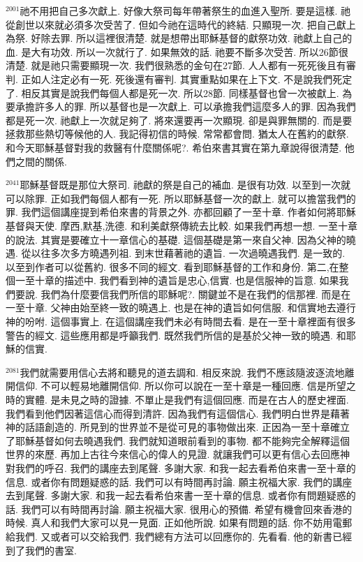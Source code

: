 \documentclass{book}
\begin{document}
$^{2001}$祂不用把自己多次獻上.
好像大祭司每年帶著祭生的血進入聖所.
要是這樣.
祂從創世以來就必須多次受苦了.
但如今祂在這時代的終結.
只顯現一次.
把自己獻上為祭.
好除去罪.
所以這裡很清楚.
就是想帶出耶穌基督的獻祭功效.
祂獻上自己的血.
是大有功效.
所以一次就行了.
如果無效的話.
祂要不斷多次受苦.
所以26節很清楚.
就是祂只需要顯現一次.
我們很熟悉的金句在27節.
人人都有一死死後且有審判.
正如人注定必有一死.
死後還有審判.
其實重點如果在上下文.
不是說我們死定了.
相反其實是說我們每個人都是死一次.
所以28節.
同樣基督也曾一次被獻上.
為要承擔許多人的罪.
所以基督也是一次獻上.
可以承擔我們這麼多人的罪.
因為我們都是死一次.
祂獻上一次就足夠了.
將來還要再一次顯現.
卻是與罪無關的.
而是要拯救那些熱切等候他的人.
我記得初信的時候.
常常都會問.
猶太人在舊約的獻祭.
和今天耶穌基督對我的救醫有什麼關係呢?.
希伯來書其實在第九章說得很清楚.
他們之間的關係.

$^{2041}$耶穌基督既是那位大祭司.
祂獻的祭是自己的補血.
是很有功效.
以至到一次就可以除罪.
正如我們每個人都有一死.
所以耶穌基督一次的獻上.
就可以擔當我們的罪.
我們這個講座提到希伯來書的背景之外.
亦都回顧了一至十章.
作者如何將耶穌基督與天使.
摩西,默基,洗德.
和利美獻祭傳統去比較.
如果我們再想一想.
一至十章的說法.
其實是要確立十一章信心的基礎.
這個基礎是第一來自父神.
因為父神的曉遇.
從以往多次多方曉遇列祖.
到末世藉著祂的遺旨.
一次過曉遇我們.
是一致的.
以至到作者可以從舊約.
很多不同的經文.
看到耶穌基督的工作和身份.
第二,在整個一至十章的描述中.
我們看到神的遺旨是忠心,信實.
也是信服神的旨意.
如果我們要說.
我們為什麼要信我們所信的耶穌呢?.
關鍵並不是在我們的信那裡.
而是在一至十章.
父神由始至終一致的曉遇上.
也是在神的遺旨如何信服.
和信實地去遵行神的吩咐.
這個事實上.
在這個講座我們未必有時間去看.
是在一至十章裡面有很多警告的經文.
這些應用都是呼籲我們.
既然我們所信的是基於父神一致的曉遇.
和耶穌的信實.

$^{2081}$我們就需要用信心去將和聽見的道去調和.
相反來說.
我們不應該隨波逐流地離開信仰.
不可以輕易地離開信仰.
所以你可以說在一至十章是一種回應.
信是所望之時的實體.
是未見之時的證據.
不單止是我們有這個回應.
而是在古人的歷史裡面.
我們看到他們因著這信心而得到清許.
因為我們有這個信心.
我們明白世界是藉著神的話語創造的.
所見到的世界並不是從可見的事物做出來.
正因為一至十章確立了耶穌基督如何去曉遇我們.
我們就知道眼前看到的事物.
都不能夠完全解釋這個世界的來歷.
再加上古往今來信心的偉人的見證.
就讓我們可以更有信心去回應神對我們的呼召.
我們的講座去到尾聲.
多謝大家.
和我一起去看希伯來書一至十章的信息.
或者你有問題疑惑的話.
我們可以有時間再討論.
願主祝福大家.
我們的講座去到尾聲.
多謝大家.
和我一起去看希伯來書一至十章的信息.
或者你有問題疑惑的話.
我們可以有時間再討論.
願主祝福大家.
很用心的預備.
希望有機會回來香港的時候.
真人和我們大家可以見一見面.
正如他所說.
如果有問題的話.
你不妨用電郵給我們.
又或者可以交給我們.
我們總有方法可以回應你的.
先看看.
他的新書已經到了我們的書室.
\end{document}
